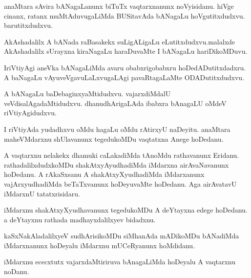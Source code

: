 \documentclass{article}
\begin{document}
\begin{mng}%
anaMtara sAvira bANagaLanunx biTuTx vaqtarxnanunx noVyisidanu. hiVge cinanx, ratanx 
muMtAduvugaLiMda BUSitavAda bANagaLu hoVgutitxdudxvu. barutitxdudxvu.
\end{mng}

\begin{mng}%
AkAshadalilx A bANada raBasakekx suLigALigaLu eLutitxdudxvu.malalxde AkAshadalilx sUrayxna 
kiraNagaLu haraDuvaMte I bANagaLu hariDikoMDuvu.
\end{mng}

\begin{mng}%
IriVtiyAgi aneVka bANagaLiMda avaru obabxrigobabxru hoDedADutitxdadxru. A baNagaLu 
vAyuveVgavuLaLxvugaLAgi pavaRtagaLaMte ODADutitxdudxvu.
\end{mng}

\begin{mng}%
A bANagaLu baDebaginxyaMtidudxvu. vajarxdiMdalU veVdisalAgadaMtidudxvu. dhanudhArigaLAda ibabxra 
bAnagaLU oMdeV riVtiyAgidudxvu.
\end{mng}

\begin{mng}%
I riVtiyAda yudadhxvu oMdu hagaLu oMdu rAtirxyU naDeyitu. anaMtara maheVMdarxnu shUlavanunx 
tegedukoMDu vaqtatxna Anege hoDedanu.
\end{mng}

\begin{mng}%
A vaqtarxnu nelakekx dhamuki caLakadiMda tAnoMdu rathavanunx Eridanu. rathadalilxdudxkoMDu 
shakAtxyAyudhadiMda iMdarxna airAvaNavanunx hoDedanu. A rAkaSxsanu A shakAtxyXyudhadiMda 
iMdarxanunx vajArxyudhadiMda beTaTxvanunx hoDeyuvaMte hoDedanu. Aga airAvatavU iMdarxnU 
tatatxrisidaru.
\end{mng}

\begin{mng}%
iMdarxnu shakAtxyXyudhavanunx tegedukoMDu A deYtayxna edege hoDedanu. a deYtayxnu rathada 
madhayxdalilxyev bidadxnu.
\end{mng}

\begin{mng}%
kaSxNakAladalilxyeV sudhArisikoMDu siMhanAda mADikoMDu bANadiMda iMdarxnanunx hoDeyalu iMdarxnu 
mUCeRyanunx hoMdidanu.
\end{mng}

\begin{mng}%
iMdarxnu ececxtutx vajarxdaMtiriruva bAnagaLiMda hoDeyalu A vaqtarxnu noDanu.
\end{mng}
\end{document}
